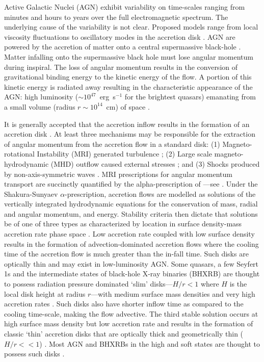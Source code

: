 \documentclass[a4paper,fleqn,usenatbib]{mnras}
\begin{document}
Active Galactic Nuclei (AGN) exhibit variability on time-scales ranging from minutes and hours to years over the full electromagnetic spectrum. The underlying cause of the variability is not clear. Proposed models range from local viscosity fluctuations to oscillatory modes in the accretion disk \citep{UrryARAA}. AGN are powered by the accretion of matter onto a central supermassive black-hole \citep{ReesARAA}. Matter infalling onto the supermassive black hole must lose angular momentum during inspiral. The loss of angular momentum results in the conversion of gravitational binding energy to the kinetic energy of the flow. A portion of this kinetic energy is radiated away resulting in the characteristic appearance of the AGN: high luminosity ($\sim 10^{47}$~erg~s$^{-1}$ for the brightest quasars) emanating from a small volume (radius $r \sim 10^{14}$~cm) of space \citep{Edelson96}.

It is generally accepted that the accretion inflow results in the formation of an accretion disk \citep*{KoratkarBlaes99,PringleARAA}. At least three mechanisms may be responsible for the extraction of angular momentum from the accretion flow in a standard disk: (1) Magneto-rotational Instability (MRI) generated turbulence \citep*{BHI,BHRev}; (2) Large scale magneto-hydrodynamic (MHD) outflow caused external stresses \citep*{BlandfordPayne82}; and (3) Shocks produced by non-axis-symmetric waves \citep{FragileBlaes08}. MRI prescriptions for angular momentum transport are succinctly quantified by the alpha-prescription of \citet{ShakuraSunyaev73}---see \citet{BalbusPapaloizou99}. Under the Shakura-Sunyaev $\alpha$-prescription, accretion flows are modelled as solutions of the vertically integrated hydrodynamic equations for the conservation of mass, radial and angular momentum, and energy. Stability criteria then dictate that solutions be of one of three types as characterized by location in surface density-mass accretion rate phase space \citep{BlaesAccretion}. Low accretion rate coupled with low surface density results in the formation of advection-dominated accretion flows \citep{NarayanYi94,ChenAbramowicz95} where the cooling time of the accretion flow is much greater than the in-fall time. Such disks are optically thin and may exist in low-luminosity AGN. Some quasars, a few Seyfert 1s and the intermediate states of black-hole X-ray binaries (BHXRB) are thought to possess radiation pressure dominated `slim' disks---$H/r < 1$ where $H$ is the local disk height at radius $r$---with medium surface mass densities and very high accretion rates \citep{Abramowicz88}. Such disks also have shorter inflow time as compared to the cooling time-scale, making the flow advective. The third stable solution occurs at high surface mass density but low accretion rate and results in the formation of classic `thin' accretion disks that are optically thick and geometrically thin ($H/r << 1$) \citep*{ShakuraSunyaev73,FKR}. Most AGN and BHXRBs in the high and soft states are thought to possess such disks \citep{BlaesAccretion}.
\end{document}
